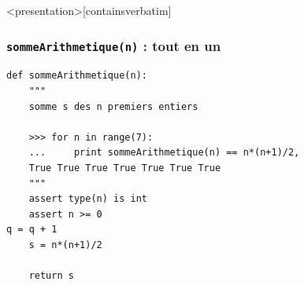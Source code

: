 \begin{frame}<presentation>[containsverbatim]
\frametitle{{\tt sommeArithmetique(n)} : tout en un}
\footnotesize
\begin{lstlisting}
def sommeArithmetique(n):
    """
    somme s des n premiers entiers
    
    >>> for n in range(7):
    ...     print sommeArithmetique(n) == n*(n+1)/2,
    True True True True True True True
    """
    assert type(n) is int
    assert n >= 0
q = q + 1
    s = n*(n+1)/2
    
    return s
\end{lstlisting}

\end{frame}

